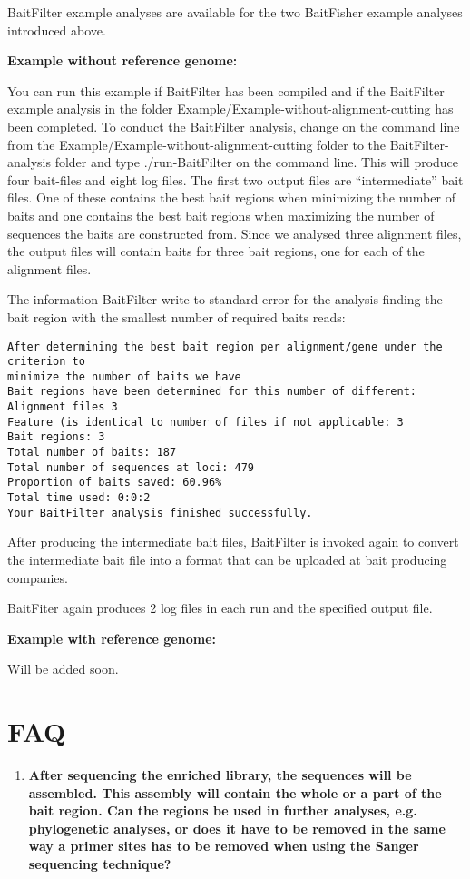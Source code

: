 \documentclass[a4paper,pdflatex,11pt]{article}
\begin{document}
BaitFilter example analyses are available for the two BaitFisher example
analyses introduced above.

\textbf{Example without reference genome:}

You can run this example if BaitFilter has been compiled and if the
BaitFilter example analysis in the folder
Example/Example-without-alignment-cutting has been completed. To conduct
the BaitFilter analysis, change on the command line from the
Example/Example-without-alignment-cutting folder to the
BaitFilter-analysis folder and type ./run-BaitFilter on the command line.
This will produce four bait-files and eight log files. The first two
output files are ``intermediate'' bait files. One of these contains the
best bait regions when minimizing the number of baits and one contains
the best bait regions when maximizing the number of sequences the baits
are constructed from. Since we analysed three alignment files, the
output files will contain baits for three bait regions, one for each of
the alignment files.

The information BaitFilter write to standard error for the analysis
finding the bait region with the smallest number of required baits
reads:

\begin{verbatim}
After determining the best bait region per alignment/gene under the criterion to
minimize the number of baits we have
Bait regions have been determined for this number of different:
Alignment files 3
Feature (is identical to number of files if not applicable: 3
Bait regions: 3
Total number of baits: 187
Total number of sequences at loci: 479
Proportion of baits saved: 60.96%
Total time used: 0:0:2
Your BaitFilter analysis finished successfully.
\end{verbatim}

After producing the intermediate bait files, BaitFilter is invoked again
to convert the intermediate bait file into a format that can be uploaded
at bait producing companies.

BaitFiter again produces 2 log files in each run and the specified
output file.

\textbf{Example with reference genome:}

Will be added soon.

\section{FAQ}

\begin{enumerate}
\def\labelenumi{(\arabic{enumi})}
\item
  \textbf{After sequencing the enriched library, the sequences will be
  assembled. This assembly will contain the whole or a part of the bait
  region. Can the regions be used in further analyses, e.g. phylogenetic
  analyses, or does it have to be removed in the same way a primer sites has to
  be removed when using the Sanger sequencing technique? }
\end{enumerate}
\end{document}
